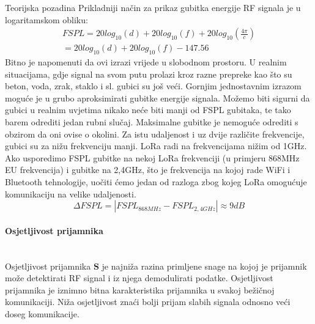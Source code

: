 \begin{subsubsection}{Teorijska pozadina}
Prikladniji način za prikaz gubitka energije RF signala je u logaritamskom obliku:
\begin{equation}
\begin{gathered}
FSPL = 20 log_{10}(d) + 20 log_{10}(f) + 20 log_{10}(\frac{4 \pi}{c})
\\
= 20 log_{10}(d) + 20 log_{10}(f) - 147.56
\end{gathered}
\label{eq:fspl_3}
\end{equation}
Bitno je napomenuti da ovi izrazi vrijede u slobodnom prostoru. U realnim situacijama, gdje signal na svom putu prolazi kroz razne prepreke kao što su beton, voda, zrak, staklo i sl. gubici su još veći. Gornjim jednostavnim izrazom moguće je u grubo aproksimirati gubitke energije signala. Možemo biti sigurni da gubici u realnim uvjetima nikako neće biti manji od FSPL gubitaka, te tako barem odrediti jedan rubni slučaj. Maksimalne gubitke je nemoguće odrediti s obzirom da oni ovise o okolini.
Za istu udaljenost i uz dvije različite frekvencije, gubici su za nižu frekvenciju manji. LoRa radi na frekvencijama nižim od 1GHz. Ako usporedimo FSPL gubitke na nekoj LoRa frekvenciji (u primjeru 868MHz EU frekvencija) i gubitke na 2,4GHz, što je frekvencija na kojoj rade WiFi i Bluetooth tehnologije, uočiti ćemo jedan od razloga zbog kojeg LoRa omogućuje komunikaciju na velike udaljenosti.
\begin{equation}
\varDelta{FSPL} = |FSPL_{868MHz} - FSPL_{2,4GHz}| \approx 9dB
\label{eq:fspl_delta}
\end{equation}

\paragraph{Osjetljivost prijamnika}\mbox{}\\
Osjetljivost prijamnika $\mathbf{S}$ je najniža razina primljene snage na kojoj je prijamnik može detektirati RF signal i iz njega demodulirati podatke. Osjetljivost prijamnika je iznimno bitna karakteristika prijamnika u svakoj bežičnoj komunikaciji. Niža osjetljivost znaći bolji prijam slabih signala odnosno veći doseg komunikacije.


\end{subsubsection}
